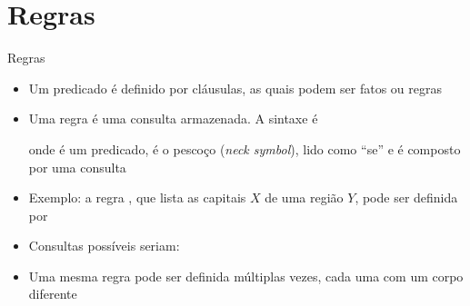 \section{Regras}

\begin{frame}[fragile]{Regras}

    \begin{itemize}
        \item Um predicado é definido por cláusulas, as quais podem ser fatos ou regras

        \item Uma regra é uma consulta armazenada. A sintaxe é


        onde  é um predicado,  é o pescoço 
        (\textit{neck symbol}), lido como ``se'' e  é composto por uma
        consulta

        \item Exemplo: a regra , que lista as capitais $X$ de uma região 
            $Y$, pode ser definida por


        \item Consultas possíveis seriam:


        \item Uma mesma regra pode ser definida múltiplas vezes, cada uma com um corpo diferente

    \end{itemize}

\end{frame}

